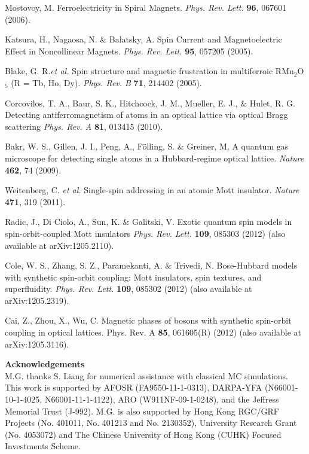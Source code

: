 \documentclass[a4paper,showpacs]{revtex4}
\begin{document}
\begin{thebibliography}{99}
 Mostovoy, M. Ferroelectricity in Spiral Magnets. \textit{Phys. Rev. Lett.} \textbf{96}, 067601 (2006).

  Katsura, H., Nagaosa, N. $\&$ Balatsky, A. Spin Current and Magnetoelectric Effect in Noncollinear Magnets. \textit{Phys. Rev. Lett.} \textbf{95}, 057205 (2005).

 Blake, G. R.\emph{et al.} Spin structure and magnetic frustration in multiferroic RMn$_{2}$O$_{5}$ (R = Tb, Ho, Dy). \textit{Phys. Rev. B} \textbf{71}, 214402
(2005).

  Corcovilos, T. A., Baur, S. K., Hitchcock, J. M., 
Mueller, E. J., $\&$ Hulet, R. G. Detecting antiferromagnetism of atoms in an optical lattice via optical Bragg scattering \textit{Phys. Rev. A} \textbf{81}, 013415 (2010).

  Bakr, W. S., Gillen, J. I., Peng, A., F\"{o}lling, S. $\&$ 
Greiner, M. A quantum gas microscope for detecting single atoms in a Hubbard-regime optical lattice. \textit{Nature} \textbf{462}, 74 (2009).

  Weitenberg, C. \emph{et al.} Single-spin addressing in an atomic Mott insulator. \textit{Nature} \textbf{471}, 319
(2011).

  Radic, J., Di Ciolo, A., Sun, K. $\&$ Galitski, V. Exotic quantum spin models in spin-orbit-coupled Mott insulators
\textit{Phys. Rev. Lett.} \textbf{109}, 085303 (2012) (also available at arXiv:1205.2110).

  Cole, W. S., Zhang, S. Z., Paramekanti, A. $\&$  Trivedi, N.
Bose-Hubbard models with synthetic spin-orbit coupling: Mott insulators, spin textures, and superfluidity. \textit{Phys. Rev. Lett.} \textbf{109}, 085302 (2012) (also available at arXiv:1205.2319).

 Cai, Z., Zhou, X., Wu,  C. Magnetic phases of bosons with synthetic spin-orbit coupling in optical lattices. Phys. Rev. A \textbf{85}, 061605(R) (2012) (also available at arXiv:1205.3116). \\
\end{thebibliography} 


{\noindent\bf{Acknowledgements}}\\
M.G. thanks S. Liang for numerical assistance with classical MC simulations. This work is supported by AFOSR
(FA9550-11-1-0313), DARPA-YFA (N66001-10-1-4025, N66001-11-1-4122), ARO (W911NF-09-1-0248), and the Jeffress Memorial Trust
(J-992). M.G. is also supported by Hong Kong RGC/GRF Projects (No. 401011, No. 401213 and No. 2130352), University Research Grant
(No. 4053072) and The Chinese University of Hong Kong (CUHK) Focused Investments Scheme. \\
\end{document}
